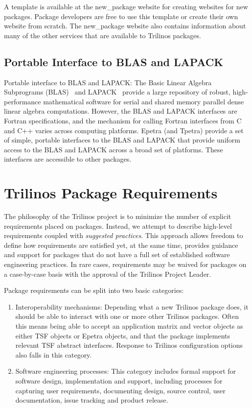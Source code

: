 \documentclass[12pt,relax]{TrilinosDevGuide}
\begin{document}
A template is available at the new\_package website \newline
{}
for creating websites for new packages.  Package developers are free to 
use this template or create their own website from scratch.  The 
new\_package website also contains information about many of the other 
services that are available to Trilinos packages.

\subsection{Portable Interface to BLAS and LAPACK}

Portable interface to BLAS and LAPACK: The Basic Linear Algebra
Subprograms (BLAS)~\cite{BLAS1,BLAS2,BLAS3} and LAPACK~\cite{lapack}
provide a large repository of robust, high-performance mathematical
software for serial and shared memory parallel dense linear algebra
computations.  However, the BLAS and LAPACK interfaces are Fortran
specifications, and the mechanism for calling Fortran interfaces from
C and C++ varies across computing platforms.  Epetra (and Tpetra)
provide a set of simple, portable interfaces to the BLAS and LAPACK
that provide uniform access to the BLAS and LAPACK across a broad
set of platforms.  These interfaces are accessible to
other packages.

\section{Trilinos Package Requirements}
\label{Section:PackageRequirements}
The philosophy of the Trilinos project is to minimize the number of
explicit requirements placed on packages.  Instead, we attempt to
describe high-level requirements coupled with {\it suggested
practices}.  This approach allows freedom to define how
requirements are satisfied yet, at the same time, provides guidance
and support for packages that do not have a full set of established
software engineering practices.  In rare cases, requirements may be waived for 
packages on a case-by-case basis with the approval of the Trilinos Project 
Leader.

Package requirements can be split into two basic categories:
\begin{enumerate}
\item Interoperability mechanisms: Depending what a new Trilinos
package does, it should be able to interact with one or more other
Trilinos packages.  Often this means being able to accept an application
matrix and vector objects as either TSF objects or Epetra objects, and
that the package implements relevant TSF abstract interfaces.
Response to Trilinos configuration options also falls in this category.
\item Software engineering processes: This category includes formal
support for software design, implementation and support, including
processes for capturing user requirements, documenting
design, source control, user documentation, issue tracking and product
release.
\end{enumerate}
\end{document}
